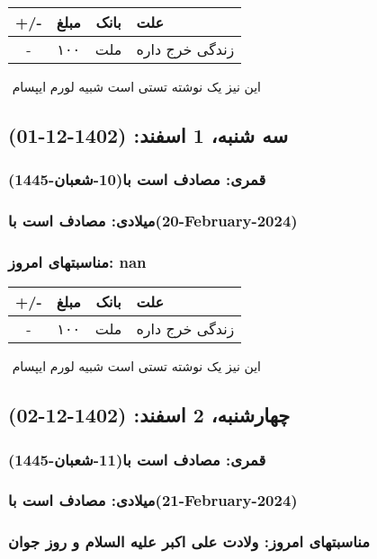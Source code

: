 \documentclass{article}
\newcommand{\rnote}[1]{\marginpar{\textcolor{color}{\StrSubstitute{\##1}{ }{\_}}}}
\newcommand{\myRow}[4]{
    #1 & #2 & #3 & #4 \\ \hline
}
\begin{document}
\begin{tabular}{ | c | c | c | p{5cm} |}
    \hline
    \myRow{ +/- }{مبلغ}{بانک}{علت}
    \myRow{-}{۱۰۰}{ملت}{زندگی خرج داره}
\end{tabular}
\newline
\newline

‌
\rnote{تست}
این نیز یک نوشته تستی است شبیه لورم ایپسام




\newpage
{}
\textcolor{color}{
\section{ سه شنبه، 1 اسفند: (1402-12-01) }
\subsubsection*{قمری: مصادف است با(10-شعبان-1445)} 
\subsubsection*{میلادی: مصادف است با(20-February-2024)}
\subsubsection*{مناسبتهای امروز: nan}
}


\begin{tabular}{ | c | c | c | p{5cm} |}
    \hline
    \myRow{ +/- }{مبلغ}{بانک}{علت}
    \myRow{-}{۱۰۰}{ملت}{زندگی خرج داره}
\end{tabular}
\newline
\newline

‌
\rnote{تست}
این نیز یک نوشته تستی است شبیه لورم ایپسام




\newpage
{}
\textcolor{color}{
\section{ چهارشنبه، 2 اسفند: (1402-12-02) }
\subsubsection*{قمری: مصادف است با(11-شعبان-1445)} 
\subsubsection*{میلادی: مصادف است با(21-February-2024)}
\subsubsection*{مناسبتهای امروز: ولادت علی اکبر علیه السلام و روز جوان}
}
\end{document}
